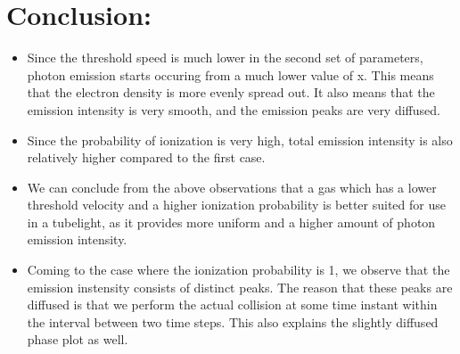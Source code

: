 \documentclass[11pt, a4paper, twoside]{article}
\begin{document}
   \section*{Conclusion:}\label{conclusion}
\begin{itemize}
\item
  Since the threshold speed is much lower in the second set of
  parameters, photon emission starts occuring from a much lower value of
  x. This means that the electron density is more evenly spread out. It
  also means that the emission intensity is very smooth, and the
  emission peaks are very diffused.
\item
  Since the probability of ionization is very high, total emission
  intensity is also relatively higher compared to the first case.
\item
  We can conclude from the above observations that a gas which has a
  lower threshold velocity and a higher ionization probability is better
  suited for use in a tubelight, as it provides more uniform and a
  higher amount of photon emission intensity.
\item
  Coming to the case where the ionization probability is 1, we observe
  that the emission instensity consists of distinct peaks. The reason
  that these peaks are diffused is that we perform the actual collision
  at some time instant within the interval between two time steps. This
  also explains the slightly diffused phase plot as well.

  \end{itemize}

	
\end{document}
